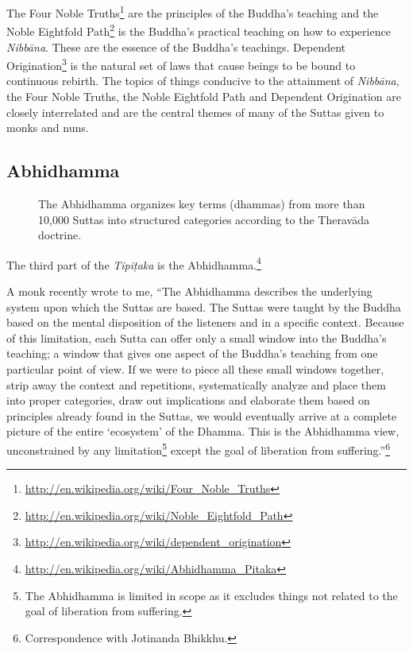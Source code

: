 The Four Noble Truths\footnote{\url{http://en.wikipedia.org/wiki/Four_Noble_Truths}} are the principles of the Buddha’s teaching and the Noble Eightfold Path\footnote{\url{http://en.wikipedia.org/wiki/Noble_Eightfold_Path}} is the Buddha’s practical teaching on how to experience \textit{Nibbāna}. These are the essence of the Buddha’s teachings. Dependent Origination\footnote{\url{http://en.wikipedia.org/wiki/dependent_origination}} is the natural set of laws that cause beings to be bound to continuous rebirth. The topics of things conducive to the attainment of \textit{Nibbāna}, the Four Noble Truths, the Noble Eightfold Path and Dependent Origination are closely interrelated and are the central themes of many of the Suttas given to monks and nuns.

\pagebreak

\subsection*{Abhidhamma}

\begin{figure}[H]
\centering

\caption{The Abhidhamma organizes key terms (dhammas) from more than 10,000 Suttas into structured categories according to the Theravāda doctrine.}
\label{fig:Funnel}
\end{figure}

The third part of the \textit{Tipiṭaka} is the Abhidhamma.\footnote{\url{http://en.wikipedia.org/wiki/Abhidhamma_Pitaka}}

A monk recently wrote to me, “The Abhidhamma describes the underlying system upon which the Suttas are based. The Suttas were taught by the Buddha based on the mental disposition of the listeners and in a specific context. Because of this limitation, each Sutta can offer only a small window into the Buddha’s teaching; a window that gives one aspect of the Buddha’s teaching from one particular point of view. If we were to piece all these small windows together, strip away the context and repetitions, systematically analyze and place them into proper categories, draw out implications and elaborate them based on principles already found in the Suttas, we would eventually arrive at a complete picture of the entire `ecosystem’ of the Dhamma. This is the Abhidhamma view, unconstrained by any limitation\footnote{The Abhidhamma is limited in scope as it excludes things not related to the goal of liberation from suffering.} except the goal of liberation from suffering.”\footnote{Correspondence with Jotinanda Bhikkhu.}

